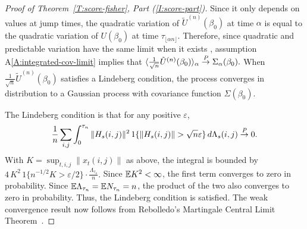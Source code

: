 \documentclass[aoas,preprint]{imsart}
\begin{document}
\begin{proof}[Proof of Theorem~\ref{T:score-fisher}, Part \textit{(\ref{I:score-part})}]
Since it only depends on values at jump times, the
quadratic variation of $\tilde U^{(n)}(\beta_0)$ at time $\alpha$ is
equal to the quadratic variation of $U(\beta_0)$ at time
$\tau_{\lfloor \alpha n \rfloor}$.  Therefore, since quadratic and predictable
variation have the same limit when it exists
\cite[Prop. 1]{rebolledo1980central}, assumption A\ref{A:integrated-cov-limit}
implies that
\(
    \langle \frac{1}{\sqrt{n}} \tilde U^{(n)}(\beta_0) \rangle_\alpha
        \overset{\mathit{P}}{\to}
            \Sigma_\alpha(\beta_0).
\)
When $\frac{1}{\sqrt{n}} \tilde U^{(n)}(\beta_0)$ satisfies a Lindeberg condition,
the process converges in distribution to a Gaussian process with covariance
function $\Sigma(\beta_0).$

The Lindeberg condition is that for any positive $\varepsilon$,
\[
    \frac{1}{n}
    \sum_{i,j}
    \int_{0}^{\tau_n}
        \| H_s(i,j) \|^2
        \, 1\{\| H_s(i,j) \| > \sqrt{n} \varepsilon \}
        \, d\Lambda_s(i,j)
        \overset{\mathit{P}}{\to}
        0.
\]
With $K = \sup_{t,i,j} \| x_t(i,j)\|$ as above, the integral is bounded by
\(
    4 \, K^2 \, 1\{n^{-1/2} K > \varepsilon / 2\}
    \cdot
    \frac{\Lambda_{\tau_n}}{n}.
\)
Since $\mathbb{E} K^2 < \infty$, the first term converges to zero in probability.
Since $\mathbb{E} \Lambda_{\tau_n} = \mathbb{E} N_{\tau_n} = n$, the product of the two also
converges to zero in probability.  Thus, the Lindeberg condition is satisfied.
The weak convergence result now follows from Rebolledo's Martingale Central
Limit Theorem~\cite{rebolledo1980central}.
\end{proof}
\end{document}
